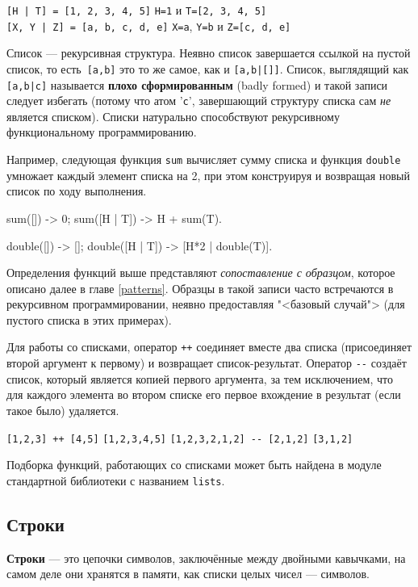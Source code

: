 \texttt{[H | T]  = [1, 2, 3, 4, 5]} \resultingin \texttt{H=1} и 
	\texttt{T=[2, 3, 4, 5]} \\
\texttt{[X, Y | Z] = [a, b, c, d, e]} \resultingin \texttt{X=a},
	\texttt{Y=b} и \texttt{Z=[c, d, e]}

Список --- рекурсивная структура. Неявно список завершается ссылкой на пустой 
список, то есть~\texttt{[a,b]} это то же самое, как и \texttt{[a,b|[]]}. 
Список, выглядящий как \texttt{[a,b|c]} называется \textbf{плохо 
сформированным} (badly formed) и такой записи следует избегать (потому что
атом '\texttt{c}', завершающий структуру списка сам \emph{не} является списком).
Списки натурально способствуют рекурсивному функциональному программированию.

Например, следующая функция \texttt{sum} вычисляет сумму списка и функция 
\texttt{double} умножает каждый элемент списка на 2, при этом конструируя и 
возвращая новый список по ходу выполнения.

\begin{erlang}
sum([]) -> 0;
sum([H | T]) -> H + sum(T).

double([]) -> [];
double([H | T]) -> [H*2 | double(T)].
\end{erlang}

Определения функций выше представляют \emph{сопоставление с образцом}, которое
описано далее в главе \ref{patterns}. Образцы в такой записи часто встречаются 
в рекурсивном программировании, неявно предоставляя "<базовый случай"> (для
пустого списка в этих примерах).

Для работы со списками, оператор \texttt{++} соединяет вместе два списка 
(присоединяет второй аргумент к первому) и возвращает список-результат.  
Оператор  \texttt{-{}-} создаёт список, который является копией первого
аргумента, за тем исключением, что для каждого элемента во втором списке его
первое вхождение в результат (если такое было) удаляется.

\texttt{[1,2,3] ++ [4,5]} \resultingin \texttt{[1,2,3,4,5]}
\texttt{[1,2,3,2,1,2] -{}- [2,1,2]} \resultingin \texttt{[3,1,2]}

Подборка функций, работающих со списками может быть найдена в модуле стандартной
библиотеки с названием \texttt{lists}.


\subsection{Строки}
\label{datatypes:string}

\textbf{Строки} --- это цепочки символов, заключённые между двойными кавычками,
на самом деле они хранятся в памяти, как списки целых чисел --- символов.

